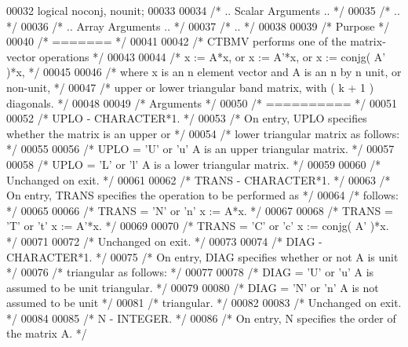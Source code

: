 \begin{DoxyCode}
00032     logical noconj, nounit;
00033 
00034 \textcolor{comment}{/*     .. Scalar Arguments .. */}
00035 \textcolor{comment}{/*     .. */}
00036 \textcolor{comment}{/*     .. Array Arguments .. */}
00037 \textcolor{comment}{/*     .. */}
00038 
00039 \textcolor{comment}{/*  Purpose */}
00040 \textcolor{comment}{/*  ======= */}
00041 
00042 \textcolor{comment}{/*  CTBMV  performs one of the matrix-vector operations */}
00043 
00044 \textcolor{comment}{/*     x := A*x,   or   x := A'*x,   or   x := conjg( A' )*x, */}
00045 
00046 \textcolor{comment}{/*  where x is an n element vector and  A is an n by n unit, or non-unit, */}
00047 \textcolor{comment}{/*  upper or lower triangular band matrix, with ( k + 1 ) diagonals. */}
00048 
00049 \textcolor{comment}{/*  Arguments */}
00050 \textcolor{comment}{/*  ========== */}
00051 
00052 \textcolor{comment}{/*  UPLO   - CHARACTER*1. */}
00053 \textcolor{comment}{/*           On entry, UPLO specifies whether the matrix is an upper or */}
00054 \textcolor{comment}{/*           lower triangular matrix as follows: */}
00055 
00056 \textcolor{comment}{/*              UPLO = 'U' or 'u'   A is an upper triangular matrix. */}
00057 
00058 \textcolor{comment}{/*              UPLO = 'L' or 'l'   A is a lower triangular matrix. */}
00059 
00060 \textcolor{comment}{/*           Unchanged on exit. */}
00061 
00062 \textcolor{comment}{/*  TRANS  - CHARACTER*1. */}
00063 \textcolor{comment}{/*           On entry, TRANS specifies the operation to be performed as */}
00064 \textcolor{comment}{/*           follows: */}
00065 
00066 \textcolor{comment}{/*              TRANS = 'N' or 'n'   x := A*x. */}
00067 
00068 \textcolor{comment}{/*              TRANS = 'T' or 't'   x := A'*x. */}
00069 
00070 \textcolor{comment}{/*              TRANS = 'C' or 'c'   x := conjg( A' )*x. */}
00071 
00072 \textcolor{comment}{/*           Unchanged on exit. */}
00073 
00074 \textcolor{comment}{/*  DIAG   - CHARACTER*1. */}
00075 \textcolor{comment}{/*           On entry, DIAG specifies whether or not A is unit */}
00076 \textcolor{comment}{/*           triangular as follows: */}
00077 
00078 \textcolor{comment}{/*              DIAG = 'U' or 'u'   A is assumed to be unit triangular. */}
00079 
00080 \textcolor{comment}{/*              DIAG = 'N' or 'n'   A is not assumed to be unit */}
00081 \textcolor{comment}{/*                                  triangular. */}
00082 
00083 \textcolor{comment}{/*           Unchanged on exit. */}
00084 
00085 \textcolor{comment}{/*  N      - INTEGER. */}
00086 \textcolor{comment}{/*           On entry, N specifies the order of the matrix A. */}

\end{DoxyCode}
